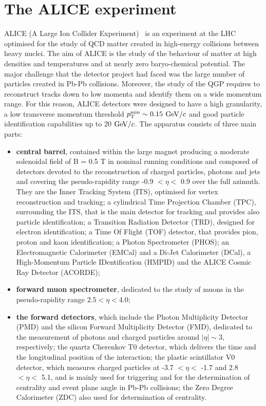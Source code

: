 \section{The ALICE experiment}
\label{sec:ALICE}
ALICE (A Large Ion Collider Experiment)~\cite{Abelev:2014ffa} is an experiment 
at the LHC optimised for the study of QCD matter
created in high-energy collisions between heavy nuclei.
The aim of ALICE is the study of the behaviour of matter at high densities and temperatures 
and at nearly zero baryo-chemical potential. 
The major challenge that the detector project had faced was the large number of 
particles created in Pb-Pb collisions. Moreover, the study of the QGP requires to reconstruct tracks down to
low momenta and identify them on a wide momentum range.
For this reason, ALICE detectors were designed to have a 
high granularity, a low transverse momentum threshold $p_{\rm T}^{\rm min} \sim 0.15 $ 
$\mathrm{GeV}/c$ and good particle identification capabilities up to 20 $\mathrm{GeV}/c$.
The apparatus consists of three main parts: 
\begin{itemize}
\item \textbf{central barrel}, contained within the large magnet producing a moderate solenoidal 
field of B = 0.5 T in nominal running conditions and composed of detectors devoted to the reconstruction of charged particles, photons
and jets and covering the pseudo-rapidity range -0.9 $< \eta <$ 0.9 over the 
full azimuth. They are the Inner Tracking System (ITS), optimised for vertex 
reconstruction and tracking; a cylindrical Time Projection Chamber (TPC),
 surrounding the ITS, that is the main detector for tracking and provides also particle identification; a 
 Transition Radiation Detector (TRD), designed for electron identification; 
 a Time Of Flight (TOF) detector, that provides pion, proton and kaon 
 identification; a Photon Spectrometer (PHOS); an Electromagnetic 
 Calorimeter (EMCal) and a Di-Jet Calorimeter (DCal), a High-Momentum Particle IDentification (HMPID) 
 and the ALICE Cosmic Ray Detector (ACORDE);
\item \textbf{forward muon spectrometer}, dedicated to the study of 
muons in the pseudo-rapidity range $2.5< \eta < 4.0$;
\item \textbf{the forward detectors}, which include the Photon Multiplicity Detector 
(PMD) and the silicon Forward Multiplicity Detector (FMD), dedicated to the 
measurement of photons and charged particles around $|\eta| \sim 3$, respectively; 
the quartz Cherenkov T0 detector, which delivers the time and the longitudinal
 position of the interaction; the plastic scintillator V0 detector, which measures 
 charged particles at -3.7 $< \eta <$ -1.7 and 2.8 $< \eta <$ 5.1, and is mainly used
  for triggering and for the determination of centrality and event plane angle in 
  Pb-Pb collisions; the Zero Degree Calorimeter (ZDC) also used for determination of centrality.
\end{itemize}
